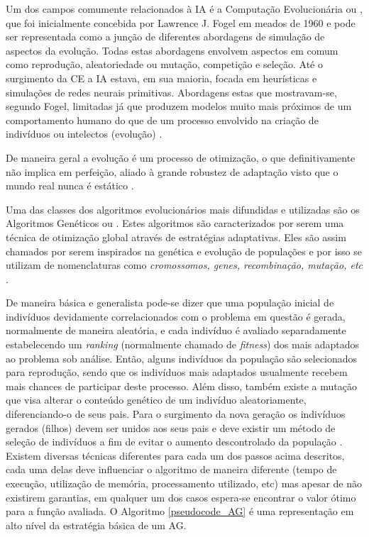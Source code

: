 Um dos campos comumente relacionados à IA é a Computação Evolucionária ou , que foi inicialmente concebida por Lawrence J. Fogel em meados de 1960 e pode ser representada como a junção de diferentes abordagens de simulação de aspectos da evolução. Todas estas abordagens envolvem aspectos em comum como reprodução, aleatoriedade ou mutação, competição e seleção. Até o surgimento da CE a IA estava, em sua maioria, focada em heurísticas e simulações de redes neurais primitivas. Abordagens estas que mostravam-se, segundo Fogel, limitadas já que produzem modelos muito mais próximos de um comportamento humano do que de um processo envolvido na criação de indivíduos ou intelectos (evolução) \cite{Book-Back2000}.

De maneira geral a evolução é um processo de otimização, o que definitivamente não implica em perfeição, aliado à grande robustez de adaptação visto que o mundo real nunca é estático \cite{Book-Back2000}.

Uma das classes dos algoritmos evolucionários mais difundidas e utilizadas são os Algoritmos Genéticos ou . Estes algoritmos são caracterizados por serem uma técnica de otimização global através de estratégias adaptativas. Eles são assim chamados por serem inspirados na genética e evolução de populações e por isso se utilizam de nomenclaturas como \emph{cromossomos, genes, recombinação, mutação, etc} \cite{Book-Brownlee2011}.

De maneira básica e generalista pode-se dizer que uma população inicial de indivíduos devidamente correlacionados com o problema em questão é gerada, normalmente de maneira aleatória, e cada indivíduo é avaliado separadamente estabelecendo um \emph{ranking} (normalmente chamado de \emph{fitness}) dos mais adaptados ao problema sob análise. Então, alguns indivíduos da população são selecionados para reprodução, sendo que os indivíduos mais adaptados usualmente recebem mais chances de participar deste processo. Além disso, também existe a mutação que visa alterar o conteúdo genético de um indivíduo aleatoriamente, diferenciando-o de seus pais. Para o surgimento da nova geração os indivíduos gerados (filhos) devem ser unidos aos seus pais e deve existir um método de seleção de indivíduos a fim de evitar o aumento descontrolado da população \cite{Book-Back2000}. Existem diversas técnicas diferentes para cada um dos passos acima descritos, cada uma delas deve influenciar o algoritmo de maneira diferente (tempo de execução, utilização de memória, processamento utilizado, etc) mas apesar de não existirem garantias, em qualquer um dos casos espera-se encontrar o valor ótimo para a função avaliada. O Algoritmo \ref{pseudocode_AG} é uma representação em alto nível da estratégia básica de um AG. 

